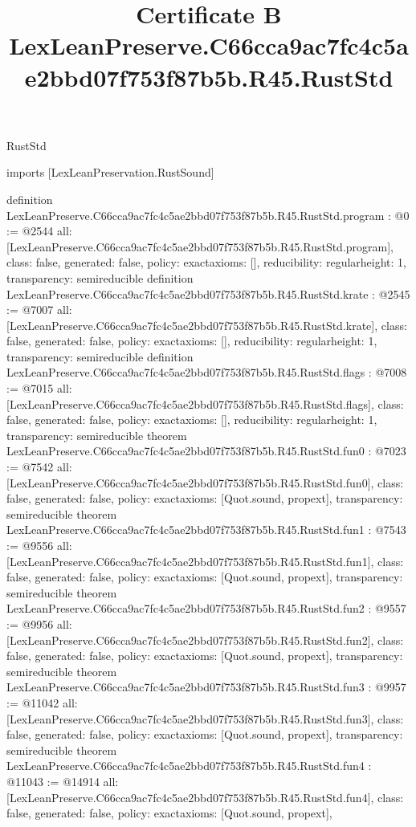 \begin{lexlean}{RustStd}
\title{Certificate B LexLeanPreserve.C66cca9ac7fc4c5ae2bbd07f753f87b5b.R45.RustStd}
\begin{coremodule}
imports [LexLeanPreservation.RustSound]

definition LexLeanPreserve.C66cca9ac7fc4c5ae2bbd07f753f87b5b.R45.RustStd.program : @0 := @2544 {
  all: [LexLeanPreserve.C66cca9ac7fc4c5ae2bbd07f753f87b5b.R45.RustStd.program],
  class: false,
  generated: false,
  policy: exact{axioms: []},
  reducibility: regular{height: 1},
  transparency: semireducible
}
definition LexLeanPreserve.C66cca9ac7fc4c5ae2bbd07f753f87b5b.R45.RustStd.krate : @2545 := @7007 {
  all: [LexLeanPreserve.C66cca9ac7fc4c5ae2bbd07f753f87b5b.R45.RustStd.krate],
  class: false,
  generated: false,
  policy: exact{axioms: []},
  reducibility: regular{height: 1},
  transparency: semireducible
}
definition LexLeanPreserve.C66cca9ac7fc4c5ae2bbd07f753f87b5b.R45.RustStd.flags : @7008 := @7015 {
  all: [LexLeanPreserve.C66cca9ac7fc4c5ae2bbd07f753f87b5b.R45.RustStd.flags],
  class: false,
  generated: false,
  policy: exact{axioms: []},
  reducibility: regular{height: 1},
  transparency: semireducible
}
theorem LexLeanPreserve.C66cca9ac7fc4c5ae2bbd07f753f87b5b.R45.RustStd.fun0 : @7023 := @7542 {
  all: [LexLeanPreserve.C66cca9ac7fc4c5ae2bbd07f753f87b5b.R45.RustStd.fun0],
  class: false,
  generated: false,
  policy: exact{axioms: [Quot.sound, propext]},
  transparency: semireducible
}
theorem LexLeanPreserve.C66cca9ac7fc4c5ae2bbd07f753f87b5b.R45.RustStd.fun1 : @7543 := @9556 {
  all: [LexLeanPreserve.C66cca9ac7fc4c5ae2bbd07f753f87b5b.R45.RustStd.fun1],
  class: false,
  generated: false,
  policy: exact{axioms: [Quot.sound, propext]},
  transparency: semireducible
}
theorem LexLeanPreserve.C66cca9ac7fc4c5ae2bbd07f753f87b5b.R45.RustStd.fun2 : @9557 := @9956 {
  all: [LexLeanPreserve.C66cca9ac7fc4c5ae2bbd07f753f87b5b.R45.RustStd.fun2],
  class: false,
  generated: false,
  policy: exact{axioms: [Quot.sound, propext]},
  transparency: semireducible
}
theorem LexLeanPreserve.C66cca9ac7fc4c5ae2bbd07f753f87b5b.R45.RustStd.fun3 : @9957 := @11042 {
  all: [LexLeanPreserve.C66cca9ac7fc4c5ae2bbd07f753f87b5b.R45.RustStd.fun3],
  class: false,
  generated: false,
  policy: exact{axioms: [Quot.sound, propext]},
  transparency: semireducible
}
theorem LexLeanPreserve.C66cca9ac7fc4c5ae2bbd07f753f87b5b.R45.RustStd.fun4 : @11043 := @14914 {
  all: [LexLeanPreserve.C66cca9ac7fc4c5ae2bbd07f753f87b5b.R45.RustStd.fun4],
  class: false,
  generated: false,
  policy: exact{axioms: [Quot.sound, propext]},
}
\end{coremodule}
\end{lexlean}
